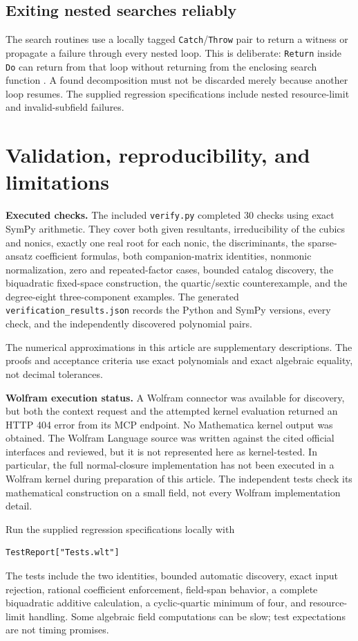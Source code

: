 \documentclass[11pt,a4paper]{article}
\newcommand{\code}[1]{\texttt{#1}}
\theoremstyle{definition}
\theoremstyle{remark}
\begin{document}
\subsection{Exiting nested searches reliably}
The search routines use a locally tagged \code{Catch}/\code{Throw} pair to return a witness or propagate a failure through every nested loop. This is deliberate: \code{Return} inside \code{Do} can return from that loop without returning from the enclosing search function \cite{return}. A found decomposition must not be discarded merely because another loop resumes. The supplied regression specifications include nested resource-limit and invalid-subfield failures.

\section{Validation, reproducibility, and limitations}
\label{sec:validation}
\textbf{Executed checks.} The included \code{verify.py} completed 30 checks using exact SymPy arithmetic. They cover both given resultants, irreducibility of the cubics and nonics, exactly one real root for each nonic, the discriminants, the sparse-ansatz coefficient formulas, both companion-matrix identities, nonmonic normalization, zero and repeated-factor cases, bounded catalog discovery, the biquadratic fixed-space construction, the quartic/sextic counterexample, and the degree-eight three-component examples. The generated \code{verification\_results.json} records the Python and SymPy versions, every check, and the independently discovered polynomial pairs.

The numerical approximations in this article are supplementary descriptions. The proofs and acceptance criteria use exact polynomials and exact algebraic equality, not decimal tolerances.

\textbf{Wolfram execution status.} A Wolfram connector was available for discovery, but both the context request and the attempted kernel evaluation returned an HTTP 404 error from its MCP endpoint. No Mathematica kernel output was obtained. The Wolfram Language source was written against the cited official interfaces and reviewed, but it is not represented here as kernel-tested. In particular, the full normal-closure implementation has not been executed in a Wolfram kernel during preparation of this article. The independent tests check its mathematical construction on a small field, not every Wolfram implementation detail.

Run the supplied regression specifications locally with
\begin{lstlisting}
TestReport["Tests.wlt"]
\end{lstlisting}
The tests include the two identities, bounded automatic discovery, exact input rejection, rational coefficient enforcement, field-span behavior, a complete biquadratic additive calculation, a cyclic-quartic minimum of four, and resource-limit handling. Some algebraic field computations can be slow; test expectations are not timing promises.
\end{document}
